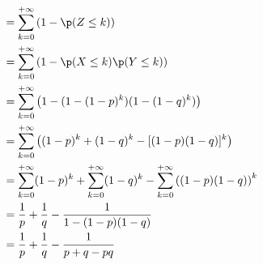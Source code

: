\documentclass[8pt]{book}
\begin{document}
\begin{enumerate}
\begin{align*}
			&=\sum\limits_{k=0}^{+\infty}\left(1-\p(Z\leq k)\right)\\
			&=\sum\limits_{k=0}^{+\infty}\left(1-\p(X\leq k)\p(Y\leq k)\right)\\
			&=\sum\limits_{k=0}^{+\infty}\left(1-(1-(1-p)^k)(1-(1-q)^k)\right)\\
			&=\sum\limits_{k=0}^{+\infty}\left((1-p)^k+(1-q)^k-[(1-p)(1-q)]^k\right)\\
			&=\sum\limits_{k=0}^{+\infty}(1-p)^k+\sum\limits_{k=0}^{+\infty}(1-q)^k-\sum\limits_{k=0}^{+\infty}\left((1-p)(1-q)\right)^k\\
			&=\frac{1}{p}+\frac{1}{q}-\frac{1}{1-(1-p)(1-q)}\\
			&=\frac{1}{p}+\frac{1}{q}-\frac{1}{p+q-pq}
		\end{align*}
	\end{enumerate}
	
	
\end{document}
